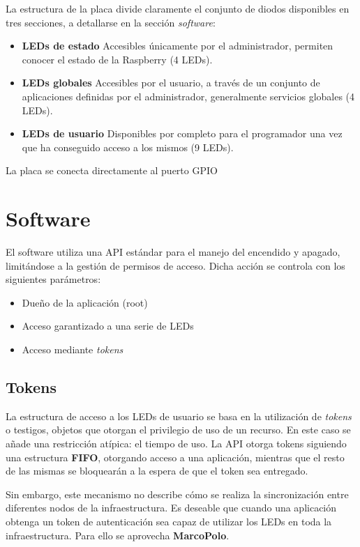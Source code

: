 \documentclass{article}
\begin{document}
La estructura de la placa divide claramente el conjunto de diodos disponibles en tres secciones, a detallarse en la sección \textit{software}:

\begin{itemize}
	\item \textbf{LEDs de estado} Accesibles únicamente por el administrador, permiten conocer el estado de la Raspberry (4 LEDs).
	\item \textbf{LEDs globales} Accesibles por el usuario, a través de un conjunto de aplicaciones definidas por el administrador, generalmente servicios globales (4 LEDs).
	\item \textbf{LEDs de usuario} Disponibles por completo para el programador una vez que ha conseguido acceso a los mismos (9 LEDs).
\end{itemize}

La placa se conecta directamente al puerto GPIO

\section{Software}

El software utiliza una API estándar para el manejo del encendido y apagado, limitándose a la gestión de permisos de acceso. Dicha acción se controla con los siguientes parámetros:

\begin{itemize}
 \item Dueño de la aplicación (root)
 \item Acceso garantizado a una serie de LEDs
 \item Acceso mediante \textit{tokens}
\end{itemize}

\subsection{Tokens}

La estructura de acceso a los LEDs de usuario se basa en la utilización de \textit{tokens} o testigos, objetos que otorgan el privilegio de uso de un recurso. En este caso se añade una restricción atípica: el tiempo de uso. La API otorga tokens siguiendo una estructura \textbf{FIFO}, otorgando acceso a una aplicación, mientras que el resto de las mismas se bloquearán a la espera de que el token sea entregado.

Sin embargo, este mecanismo no describe cómo se realiza la sincronización entre diferentes nodos de la infraestructura. Es deseable que cuando una aplicación obtenga un token de autenticación sea capaz de utilizar los LEDs en toda la infraestructura. Para ello se aprovecha \textbf{MarcoPolo}.
\end{document}
